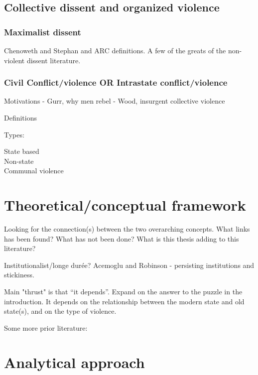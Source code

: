 \documentclass[12pt]{article}
\begin{document}
\subsection{Collective dissent and organized violence} \label{Collective dissent and organized violence}

\subsubsection{Maximalist dissent} \label{Maximalist dissent}

Chenoweth and Stephan and ARC definitions. A few of the greats of the
non-violent dissent literature.

\subsubsection{Civil Conflict/violence OR Intrastate conflict/violence} \label{Civil Conflict}

Motivations - Gurr, why men rebel - Wood, insurgent collective violence

Definitions

Types:

State based \\

Non-state \\ 

Communal violence \\

\section{Theoretical/conceptual framework} \label{Theoretical/conceptual framework}

Looking for the connection(s) between the two overarching concepts. What links
has been found? What has not been done? What is this thesis adding to this
literature? 

Institutionalist/longe durée? Acemoglu and Robinson - persisting institutions
and stickiness.

Main "thrust" is that ``it depends''. Expand on the answer to the puzzle in the
introduction. It depends on the relationship between the modern state and old
state(s), and on the type of violence.

Some more prior literature: \citet{Griffiths2016} \citet{Ahram2019}

\section{Analytical approach} \label{Analytical approach}
\end{document}
